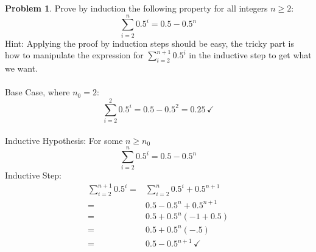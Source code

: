 \documentclass[10pt,leqno ]{article}
\theoremstyle{definition}
\newtheorem{problem}[theorem]{Problem}
\begin{document}
\begin{problem} Prove by induction the following property for all integers $n \geq 2$:
$$\sum_{i=2}^{n}0.5^i = 0.5-0.5^n$$
Hint:  Applying the proof by induction steps should be easy, the tricky part is how  to  manipulate  the  expression  for $\sum_{i=2}^{n+1}0.5^i$ in  the  inductive  step  to  get what we want.
\\\\
\Large
Base Case, where $n_0=2$:
$$\sum_{i=2}^{2}0.5^i = 0.5 - 0.5^2 = 0.25 \, \checkmark$$
\\
Inductive Hypothesis:  For some $n \geq n_0$
$$\sum_{i=2}^{n}0.5^i = 0.5-0.5^n$$
Inductive Step:
\begin{align*}
\sum_{i=2}^{n+1}0.5^i =& \sum_{i=2}^{n}0.5^i + 0.5^{n+1} \\
                      =&   0.5-0.5^n + 0.5^{n+1} \\
                      =& 0.5 + 0.5^n(-1 + 0.5)\\
                      =& 0.5 + 0.5^n(-.5)\\
                      =&   0.5 - 0.5^{n+1} \, \checkmark
\end{align*}

\end{problem}
\newpage
\end{document}
